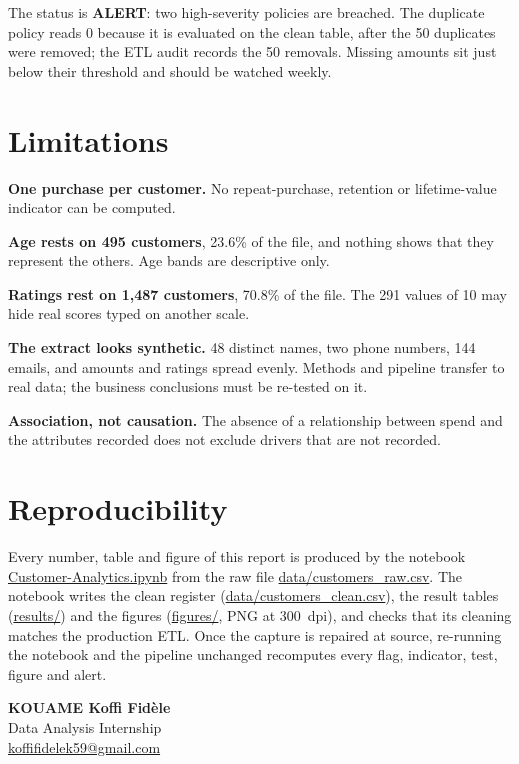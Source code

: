\documentclass[12pt,a4paper]{article}
\newcommand{\F}[1]{{\small\url{#1}}}
\begin{document}
The status is \textbf{ALERT}: two high-severity policies are breached. The duplicate
policy reads 0 because it is evaluated on the clean table, after the 50 duplicates
were removed; the ETL audit records the 50 removals. Missing amounts sit just below
their threshold and should be watched weekly.

\section{Limitations}

\textbf{One purchase per customer.} No repeat-purchase, retention or lifetime-value
indicator can be computed.

\textbf{Age rests on 495 customers}, 23.6\% of the file, and nothing shows that they
represent the others. Age bands are descriptive only.

\textbf{Ratings rest on 1{,}487 customers}, 70.8\% of the file. The 291 values of 10
may hide real scores typed on another scale.

\textbf{The extract looks synthetic.} 48 distinct names, two phone numbers, 144 emails,
and amounts and ratings spread evenly. Methods and pipeline transfer to real data;
the business conclusions must be re-tested on it.

\textbf{Association, not causation.} The absence of a relationship between spend and
the attributes recorded does not exclude drivers that are not recorded.

\section{Reproducibility}

Every number, table and figure of this report is produced by the notebook
\F{Customer-Analytics.ipynb} from the raw file \F{data/customers_raw.csv}. The
notebook writes the clean register (\F{data/customers_clean.csv}), the result tables
(\F{results/}) and the figures (\F{figures/}, PNG at 300~dpi), and checks that its
cleaning matches the production ETL. Once the capture is repaired at source,
re-running the notebook and the pipeline unchanged recomputes every flag, indicator,
test, figure and alert.

\vspace{0.3cm}
\noindent\hfill\begin{minipage}{7cm}\begin{flushright}\singlespacing
\textbf{KOUAME Koffi Fid\`ele}\\
Data Analysis Internship\\
\href{mailto:koffifidelek59@gmail.com}{koffifidelek59@gmail.com}
\end{flushright}\end{minipage}
\end{document}
